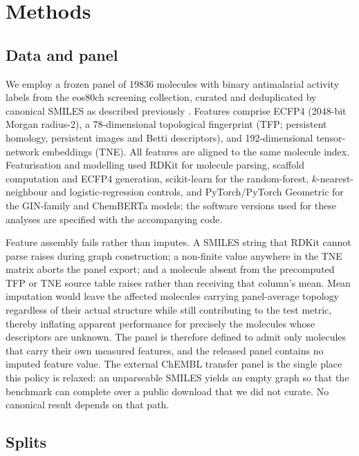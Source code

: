 \documentclass[11pt,a4paper]{article}
\begin{document}
\section{Methods}

\subsection{Data and panel}

We employ a frozen panel of \num{19836} molecules with binary antimalarial activity labels from the eos80ch screening collection, curated and deduplicated by canonical SMILES as described previously \citep{temgoua2026antimalarial}. Features comprise ECFP4 (\num{2048}-bit Morgan radius-\num{2}), a \num{78}-dimensional topological fingerprint (TFP; persistent homology, persistent images and Betti descriptors), and \num{192}-dimensional tensor-network embeddings (TNE). All features are aligned to the same molecule index. Featurisation and modelling used RDKit \citep{RDKit} for molecule parsing, scaffold computation and ECFP4 generation, scikit-learn for the random-forest, $k$-nearest-neighbour and logistic-regression controls, and PyTorch/PyTorch Geometric for the GIN-family and ChemBERTa models; the software versions used for these analyses are specified with the accompanying code.

Feature assembly fails rather than imputes. A SMILES string that RDKit cannot parse raises during graph construction; a non-finite value anywhere in the TNE matrix aborts the panel export; and a molecule absent from the precomputed TFP or TNE source table raises rather than receiving that column's mean. Mean imputation would leave the affected molecules carrying panel-average topology regardless of their actual structure while still contributing to the test metric, thereby inflating apparent performance for precisely the molecules whose descriptors are unknown. The panel is therefore defined to admit only molecules that carry their own measured features, and the released panel contains no imputed feature value. The external ChEMBL transfer panel is the single place this policy is relaxed: an unparseable SMILES yields an empty graph so that the benchmark can complete over a public download that we did not curate. No canonical result depends on that path.

\subsection{Splits}
\end{document}

